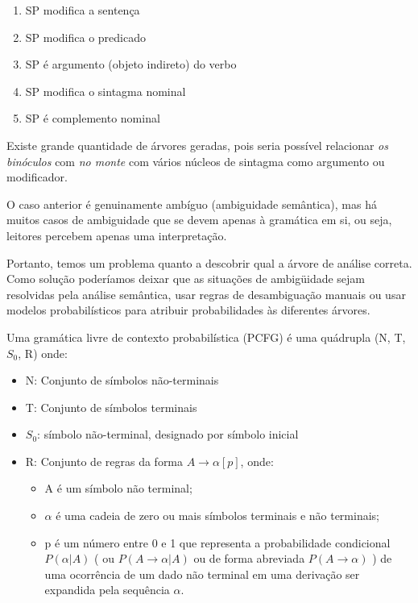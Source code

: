 \begin{enumerate}
    \tiny
    \item SP modifica a sentença
    \item SP modifica o predicado
    \item SP é argumento (objeto indireto) do verbo
    \item SP modifica o sintagma nominal
    \item SP é complemento nominal
\end{enumerate}

Existe grande quantidade de árvores geradas, pois seria possível relacionar \emph{os binóculos} com \emph{no monte} com vários núcleos de sintagma como argumento ou modificador.

O caso anterior é genuinamente ambíguo (ambiguidade semântica), mas há muitos casos de ambiguidade que se devem apenas à gramática em si, ou seja, leitores percebem apenas uma interpretação.

Portanto, temos um problema quanto a descobrir qual a árvore de análise correta. Como solução poderíamos deixar que as situações de ambigüidade sejam resolvidas pela análise semântica, usar regras de desambiguação manuais ou usar modelos probabilísticos para atribuir probabilidades às diferentes árvores.

Uma gramática livre de contexto probabilística (PCFG) é uma quádrupla (N, T, $S_0$, R) onde:

 \begin{itemize}

   \item N: Conjunto de símbolos não-terminais
   \item T: Conjunto de símbolos terminais
   \item $S_0$: símbolo não-terminal, designado por símbolo inicial
   \item R: Conjunto de regras da forma $ A \rightarrow \alpha [p] $, onde:

    \begin{itemize}
      \item A é um símbolo não terminal;
      \item  $\alpha$ é uma cadeia de zero ou mais símbolos terminais e não terminais;
      \item p é um número entre 0 e 1 que representa a probabilidade condicional $P(\alpha | A)$ ( ou $P(A \rightarrow \alpha | A)$  ou de forma abreviada $P(A \rightarrow \alpha)$ ) de uma ocorrência de um dado não terminal em uma derivação ser expandida pela sequência $\alpha$.
    \end{itemize}

 \end{itemize}


